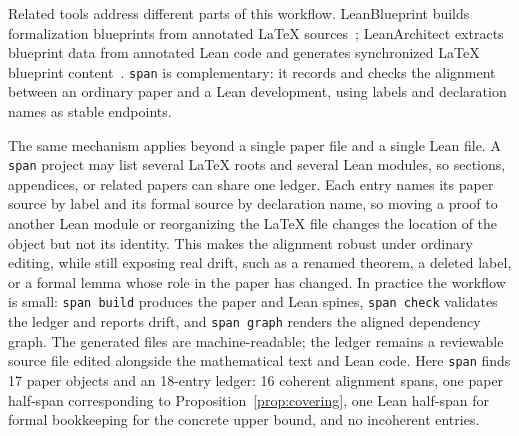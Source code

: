 \documentclass[11pt]{article}
\theoremstyle{plain}
\theoremstyle{definition}
\begin{document}
Related tools address different parts of this workflow.  LeanBlueprint builds
formalization blueprints from annotated LaTeX sources~\cite{LeanBlueprint};
LeanArchitect extracts blueprint data from annotated Lean code and generates
synchronized LaTeX blueprint content~\cite{LeanArchitect}.  \texttt{span} is
complementary: it records and checks the alignment between an ordinary paper and
a Lean development, using labels and declaration names as stable endpoints.

The same mechanism applies beyond a single paper file and a single Lean file.
A \texttt{span} project may list several LaTeX roots and several Lean modules,
so sections, appendices, or related papers can share one ledger.  Each entry
names its paper source by label and its formal source by declaration name, so
moving a proof to another Lean module or reorganizing the LaTeX file changes the
location of the object but not its identity.  This makes the alignment robust
under ordinary editing, while still exposing real drift, such as a renamed
theorem, a deleted label, or a formal lemma whose role in the paper has changed.
In practice the workflow is small: \texttt{span build} produces the paper and
Lean spines, \texttt{span check} validates the ledger and reports drift, and
\texttt{span graph} renders the aligned dependency graph.  The generated files
are machine-readable; the ledger remains a reviewable source file edited
alongside the mathematical text and Lean code.  Here \texttt{span} finds 17
paper objects and an 18-entry ledger: 16 coherent alignment spans, one paper
half-span corresponding to Proposition~\ref{prop:covering}, one Lean half-span
for formal bookkeeping for the concrete upper bound, and no incoherent entries.
\end{document}
